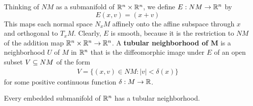 Thinking of $NM$ as a submanifold of $\mathbb{R}^n\times\mathbb{R}^n$, we define $E:NM\to\mathbb{R}^n$ by
\[E(x,v)=(x+v)\]
This maps each normal space $N_xM$ affinely onto the affine subspace through $x$ and orthogonal to $T_xM$. Clearly, $E$ is smooth, because it is the restriction to $NM$ of the addition map $\mathbb{R}^n\times\mathbb{R}^n\to\mathbb{R}^n$. A \textbf{tubular neighborhood of $\bm{M}$} is a neighborhood $U$ of $M$ in $\mathbb{R}^n$ that is the diffeomorphic image under $E$ of an open subset $V\subseteq NM$ of the form
\begin{align}\label{tubular}
V=\{(x,v)\in NM:|v|<\delta(x)\}
\end{align}
for some positive continuous function $\delta:M\to\mathbb{R}$.
\begin{theorem}\label{Euclidean tubular neighborhood}
Every embedded submanifold of $\mathbb{R}^n$ has a tubular neighborhood.
\end{theorem}
